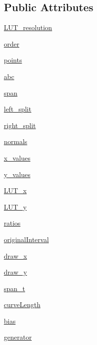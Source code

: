\subsection*{Public Attributes}
\begin{DoxyCompactItemize}
\item 
\hyperlink{classbezier_1_1_bezier_curve_a631e45794713c37b7b28a1116bf7d414}{L\+U\+T\+\_\+resolution}
\item 
\hyperlink{classbezier_1_1_bezier_curve_a0f9a46cd0b0c3060c81c503e97718e87}{order}
\item 
\hyperlink{classbezier_1_1_bezier_curve_a6c39346893b0610e98d124f94f098b5b}{points}
\item 
\hyperlink{classbezier_1_1_bezier_curve_a9cf4bf17eddb3214f5727e9b45a15d62}{abc}
\item 
\hyperlink{classbezier_1_1_bezier_curve_abd2b09d5ae706c4e31f22b0c199134c0}{span}
\item 
\hyperlink{classbezier_1_1_bezier_curve_a958ec48826bf0bfd4f29c73641fd7562}{left\+\_\+split}
\item 
\hyperlink{classbezier_1_1_bezier_curve_a1537b07a507ce3a670363ca50fcfb8b9}{right\+\_\+split}
\item 
\hyperlink{classbezier_1_1_bezier_curve_a2cf138c2853916d8fdd6ee538decd11b}{normals}
\item 
\hyperlink{classbezier_1_1_bezier_curve_abae064c2182ba700fb576355e7d15bab}{x\+\_\+values}
\item 
\hyperlink{classbezier_1_1_bezier_curve_a8bf9aa7947c5ff98a513b2119c3bebac}{y\+\_\+values}
\item 
\hyperlink{classbezier_1_1_bezier_curve_a4577c6349bf8568b0f0a6259c361c42d}{L\+U\+T\+\_\+x}
\item 
\hyperlink{classbezier_1_1_bezier_curve_a5c47bd22203df84b3c9ef64389134d9d}{L\+U\+T\+\_\+y}
\item 
\hyperlink{classbezier_1_1_bezier_curve_aebb06c5028ed907c85c179cef3fd5f47}{ratios}
\item 
\hyperlink{classbezier_1_1_bezier_curve_acea4fdceeab227eb5ad09f52f9b58e40}{original\+Interval}
\item 
\hyperlink{classbezier_1_1_bezier_curve_a66a3a2b3ee0242789790ceace4b8c507}{draw\+\_\+x}
\item 
\hyperlink{classbezier_1_1_bezier_curve_a1859a14a8e80f71956ff806565be4e0d}{draw\+\_\+y}
\item 
\hyperlink{classbezier_1_1_bezier_curve_a79e5e878938d38339da6d3bebb7bf337}{span\+\_\+t}
\item 
\hyperlink{classbezier_1_1_bezier_curve_ad2535ff3f7797701c3bae55252cff911}{curve\+Length}
\item 
\hyperlink{classbezier_1_1_bezier_curve_a76880ee12be206cb218322e95cfa7658}{bias}
\item 
\hyperlink{classbezier_1_1_bezier_curve_aa3abeeffa97dabf2038f1a8f7d0f1940}{generator}
\end{DoxyCompactItemize}
